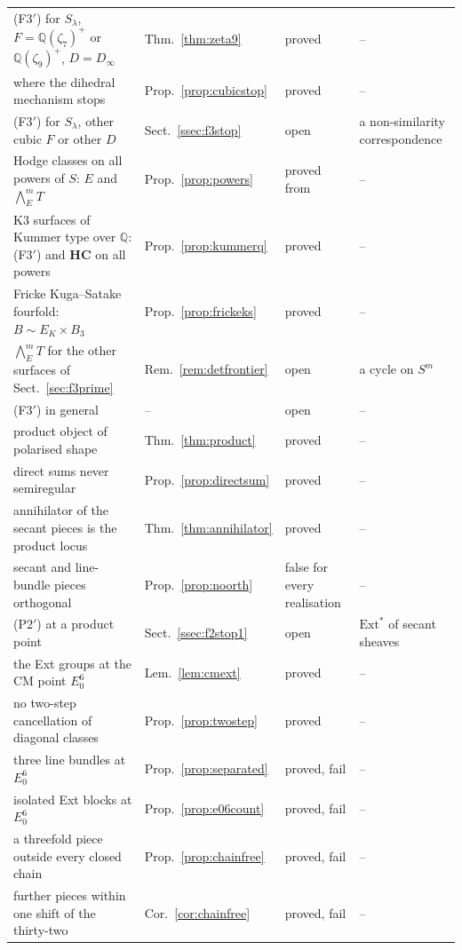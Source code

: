 \documentclass[11pt,reqno]{amsart}
\numberwithin{equation}{section}
\theoremstyle{plain}
\theoremstyle{definition}
\newcommand{\QQ}{\mathbb{Q}}
\newcommand{\Ext}{\mathrm{Ext}}
\newcommand{\HC}{\mathbf{HC}}
\newcommand{\Fiii}{\texorpdfstring{\textup{(F3$'$)}}{(F3')}}
\begin{document}
\begin{longtable}{@{}>{\raggedright\arraybackslash}p{}>{\raggedright\arraybackslash}p{}>{\raggedright\arraybackslash}p{}>{\raggedright\arraybackslash}p{}@{}}
\Fiii{} for $S_{\lambda}$, $F=\QQ(\zeta_{7})^{+}$ or $\QQ(\zeta_{9})^{+}$, $D=D_{\infty}$ & Thm.~\ref{thm:zeta9} & proved & -- \\
where the dihedral mechanism stops & Prop.~\ref{prop:cubicstop} & proved & -- \\
\Fiii{} for $S_{\lambda}$, other cubic $F$ or other $D$ & Sect.~\ref{ssec:f3stop} & open & a non-similarity correspondence \\
Hodge classes on all powers of $S$: $E$ and $\bigwedge^{m}_{E}T$ & Prop.~\ref{prop:powers} & proved from \cite{Var25} & -- \\
K3 surfaces of Kummer type over $\QQ$: \Fiii{} and $\HC$ on all powers & Prop.~\ref{prop:kummerq} & proved & -- \\
Fricke Kuga--Satake fourfold: $B\sim E_{K}\times B_{3}$ & Prop.~\ref{prop:frickeks} & proved & -- \\
$\bigwedge^{m}_{E}T$ for the other surfaces of Sect.~\ref{sec:f3prime} & Rem.~\ref{rem:detfrontier} & open & a cycle on $S^{m}$ \\
\Fiii{} in general & -- & open & -- \\
product object of polarised shape & Thm.~\ref{thm:product} & proved & -- \\
direct sums never semiregular & Prop.~\ref{prop:directsum} & proved & -- \\
annihilator of the secant pieces is the product locus & Thm.~\ref{thm:annihilator} & proved & -- \\
secant and line-bundle pieces orthogonal & Prop.~\ref{prop:noorth} & false for every realisation & -- \\
(P2$'$) at a product point & Sect.~\ref{ssec:f2stop1} & open & $\Ext^{*}$ of secant sheaves \\
the Ext groups at the CM point $E_{0}^{6}$ & Lem.~\ref{lem:cmext} & proved & -- \\
no two-step cancellation of diagonal classes & Prop.~\ref{prop:twostep} & proved & -- \\
three line bundles at $E_{0}^{6}$ & Prop.~\ref{prop:separated} & proved, fail & -- \\
isolated Ext blocks at $E_{0}^{6}$ & Prop.~\ref{prop:e06count} & proved, fail & -- \\
a threefold piece outside every closed chain & Prop.~\ref{prop:chainfree} & proved, fail & -- \\
further pieces within one shift of the thirty-two & Cor.~\ref{cor:chainfree} & proved, fail & -- \\

\end{longtable}
\end{document}
